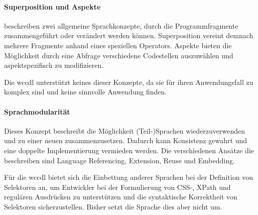     \paragraph{Superposition und Aspekte}
    \citet[Kapitel 5.1.6]{voelter:DslEngineering} beschreiben zwei
    allgemeine Sprachkonzepte, durch die Programmfragmente zusammengeführt
    oder verändert werden können.
    Superposition vereint demnach mehrere Fragmente anhand eines speziellen Operators.
    Aspekte bieten die Möglichkeit durch eine Abfrage verschiedene Codestellen
    auszuwählen und aspektspezifisch zu modifizieren.

    Die \gls{wccdl} unterstützt keines dieser Konzepte,
    da sie für ihren Anwendungsfall zu komplex sind und keine sinnvolle Anwendung finden.

    \paragraph{Sprachmodularität}
    Dieses Konzept beschreibt die Möglichkeit (Teil-)Sprachen wiederzuverwenden
    und zu einer neuen zusammenzusetzen.
    Dadurch kann Konsistenz gewahrt und eine doppelte Implementierung vermieden werden.
    Die verschiedenen Ansätze die \citet[Kapitel 4.6]{voelter:DslEngineering} beschreiben
    sind Language Referencing, Extension, Reuse und Embedding.

    Für die \gls{wccdl} bietet sich die Einbettung anderer Sprachen bei der Definition von Selektoren an,
    um Entwickler bei der Formulierung von CSS-, XPath und regulären Ausdrücken zu unterstützen
    und die syntaktische Korrektheit von Selektoren sicherzustellen.
    Bisher setzt die Sprache dies aber nicht um.
